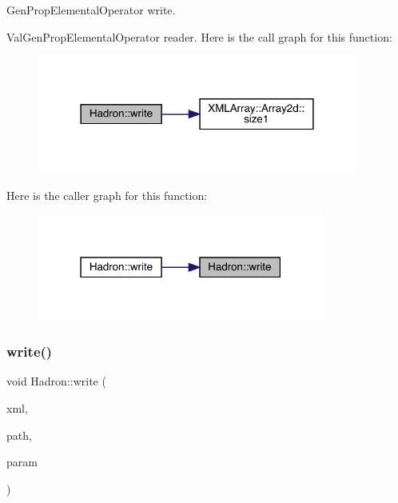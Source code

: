 Gen\+Prop\+Elemental\+Operator write. 

Val\+Gen\+Prop\+Elemental\+Operator reader. Here is the call graph for this function\+:
\nopagebreak
\begin{figure}[H]
\begin{center}
\leavevmode
\includegraphics[width=298pt]{d1/daf/namespaceHadron_a276bd4448f8f6233aa951856e912651e_cgraph}
\end{center}
\end{figure}
Here is the caller graph for this function\+:
\nopagebreak
\begin{figure}[H]
\begin{center}
\leavevmode
\includegraphics[width=267pt]{d1/daf/namespaceHadron_a276bd4448f8f6233aa951856e912651e_icgraph}
\end{center}
\end{figure}
\mbox{\label{namespaceHadron_ab67658d0abad845f6efa3ba94de7692c}} 
\subsubsection{\texorpdfstring{write()}{write()}\hspace{0.1cm}{\footnotesize\ttfamily [76/95]}}
{\footnotesize\ttfamily void Hadron\+::write (\begin{DoxyParamCaption}\item[{\mbox{\hyperlink{classADATXML_1_1XMLWriter}{X\+M\+L\+Writer}} \&}]{xml,  }\item[{const std\+::string \&}]{path,  }\item[{const \mbox{\hyperlink{structHadron_1_1KeyHadronNode__t}{Key\+Hadron\+Node\+\_\+t}} \&}]{param }\end{DoxyParamCaption})}



